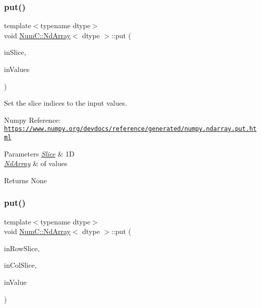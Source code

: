 \subsubsection{\texorpdfstring{put()}{put()}\hspace{0.1cm}{\footnotesize\ttfamily [6/12]}}
{\footnotesize\ttfamily template$<$typename dtype$>$ \\
void \mbox{\hyperlink{class_num_c_1_1_nd_array}{Num\+C\+::\+Nd\+Array}}$<$ dtype $>$\+::put (\begin{DoxyParamCaption}\item[{const \mbox{\hyperlink{class_num_c_1_1_slice}{Slice}} \&}]{in\+Slice,  }\item[{const \mbox{\hyperlink{class_num_c_1_1_nd_array}{Nd\+Array}}$<$ dtype $>$ \&}]{in\+Values }\end{DoxyParamCaption})\hspace{0.3cm}{\ttfamily [inline]}}

Set the slice indices to the input values.

Numpy Reference\+: \href{https://www.numpy.org/devdocs/reference/generated/numpy.ndarray.put.html}{\tt https\+://www.\+numpy.\+org/devdocs/reference/generated/numpy.\+ndarray.\+put.\+html}


\begin{DoxyParams}{Parameters}
{\em \mbox{\hyperlink{class_num_c_1_1_slice}{Slice}}} & 1D \\
\hline
{\em \mbox{\hyperlink{class_num_c_1_1_nd_array}{Nd\+Array}}} & of values \\
\hline
\end{DoxyParams}
\begin{DoxyReturn}{Returns}
None 
\end{DoxyReturn}
\mbox{\label{class_num_c_1_1_nd_array_a96e788a4524cbf562f57a4b7b4c559f7}} 
\subsubsection{\texorpdfstring{put()}{put()}\hspace{0.1cm}{\footnotesize\ttfamily [7/12]}}
{\footnotesize\ttfamily template$<$typename dtype$>$ \\
void \mbox{\hyperlink{class_num_c_1_1_nd_array}{Num\+C\+::\+Nd\+Array}}$<$ dtype $>$\+::put (\begin{DoxyParamCaption}\item[{const \mbox{\hyperlink{class_num_c_1_1_slice}{Slice}} \&}]{in\+Row\+Slice,  }\item[{const \mbox{\hyperlink{class_num_c_1_1_slice}{Slice}} \&}]{in\+Col\+Slice,  }\item[{dtype}]{in\+Value }\end{DoxyParamCaption})\hspace{0.3cm}{\ttfamily [inline]}}

